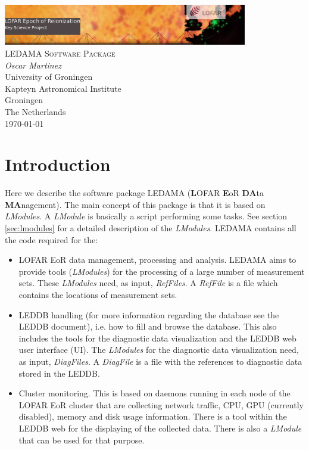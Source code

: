 \documentclass[a4paper,11pt]{article}
\begin{document}
\begin{titlepage}
\begin{center}
\includegraphics[width=0.8\textwidth]{fig/eorlogo}\\[3cm]    
\textsc{\LARGE LEDAMA Software Package}\\[0.5cm]
\vfill
{\large
\emph{Oscar Martinez} \\
University of Groningen \\
Kapteyn Astronomical Institute \\
Groningen \\
The Netherlands \\
\today}
\end{center}
\end{titlepage}


\tableofcontents
\newpage

\section{Introduction}

Here we describe the software package LEDAMA (\textbf{L}OFAR \textbf{E}oR \textbf{DA}ta \textbf{MA}nagement). The main concept of this package is that it is based on \textit{LModules}. A \textit{LModule} is basically a script performing some tasks. See section \ref{sec:lmodules} for a detailed description of the \textit{LModules}. LEDAMA contains all the code required for the:

\begin{itemize}
    \item LOFAR EoR data management, processing and analysis. LEDAMA aims to provide tools (\textit{LModules}) for the processing of a large number of measurement sets. These \textit{LModules} need, as input, \textit{RefFiles}. A \textit{RefFile} is a file which contains the locations of measurement sets.
      
    \item LEDDB handling (for more information regarding the database see the LEDDB document), i.e. how to fill and browse the database. This also includes the tools for the diagnostic data visualization and the LEDDB web user interface (UI). The \textit{LModules} for the diagnostic data visualization need, as input, \textit{DiagFiles}. A \textit{DiagFile} is a file with the references to diagnostic data stored in the LEDDB.
      
    \item Cluster monitoring. This is based on daemons running in each node of the LOFAR EoR cluster that are collecting network traffic, CPU, GPU (currently disabled), memory and disk usage information. There is a tool within the LEDDB web for the displaying of the collected data. There is also a \textit{LModule} that can be used for that purpose.
\end{itemize}
\end{document}
